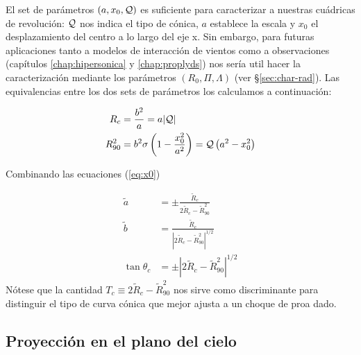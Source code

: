 El set de parámetros $(a, x_0, \mathcal{Q})$ es suficiente para caracterizar a nuestras cuádricas de revolución: $\mathcal{Q}$ nos indica el tipo de cónica, $a$ establece la escala y $x_0$ el desplazamiento del centro a lo largo del eje x. Sin embargo, para futuras aplicaciones tanto a modelos de interacción de vientos como a observaciones (capítulos \ref{chap:hipersonica} y \ref{chap:proplyds}) nos sería util hacer la caracterización mediante los parámetros $(R_0, \Pi, \Lambda)$ (ver \S \ref{sec:char-rad}). Las equivalencias entre los dos sets de parámetros los calculamos a continuación:


\begin{align}
  R_c &= \frac{b^2}{a} = a|\mathcal{Q}|\label{eq:R-curv-conic}\\
  R^2_{90} &= b^2\sigma\left(1 - \frac{x^2_0}{a^2}\right) = \mathcal{Q}\left(a^2 - x^2_0\right)\label{eq:R90-conic}
\end{align}

Combinando las ecuaciones (\ref{eq:x0})

\begin{align}
  \tilde{a} &= \pm\frac{\tilde{R}_c}{2\tilde{R}_c - \tilde{R}_{90}^2} \label{eq:til-a}\\
  \tilde{b} &= \frac{\tilde{R}_c}{\left|2\tilde{R}_c - \tilde{R}_{90}^2\right|^{1/2}}\label{eq:til-b}\\
  \tan\theta_c &= \pm\left|2\tilde{R}_c - \tilde{R}_{90}^2\right|^{1/2} \label{eq:thc2}
\end{align}
Nótese que la cantidad $T_c\equiv 2\tilde{R}_c - \tilde{R}_{90}^2$ nos sirve como discriminante para distinguir el tipo de curva cónica que mejor ajusta a un choque de proa dado.

\subsection{Proyección en el plano del cielo}


